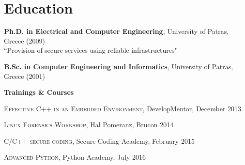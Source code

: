 \documentclass[alan.tex]{subfiles}
\begin{document}
  \section{Education}
  \begin{description}
    \item \textbf{Ph.D. in Electrical and Computer Engineering}, University of Patras, Greece (2009)\\
    ``Provision of secure services using reliable infrastructures"
    \item \textbf{B.Sc. in Computer Engineering and Informatics}, University of Patras, Greece (2001)
  \end{description}
  \begin{description}
  \item \textbf{Trainings \& Courses}
    \begin{description}
      \item \textsc{Effective C++ in an Embedded Environment}, DevelopMentor, December 2013
      \item \textsc{Linux Forensics Workshop}, Hal Pomeranz, Brucon 2014
      \item \textsc{C/C++ secure coding}, Secure Coding Academy, February 2015
      \item \textsc{Advanced Python}, Python Academy, July 2016
    \end{description}
  \end{description}
\end{document}

